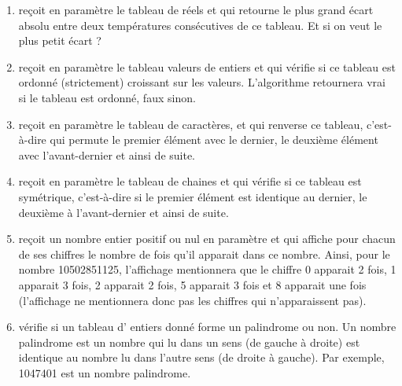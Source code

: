 \documentclass[11pt,a4paper]{article}
\begin{document}
					\begin{enumerate}
				
			\item  re\c coit en param\`etre le tableau  de 
              \verb@n@  r\'eels et qui retourne
              le plus grand \'ecart absolu entre deux temp\'eratures cons\'ecutives de ce tableau. Et si on veut
              le plus petit \'ecart ?
            
			\item 
              re\c coit en param\`etre le tableau valeurs de \verb@n@ entiers et qui v\'erifie si ce
              tableau est ordonn\'e (strictement) croissant sur les valeurs. L'algorithme retournera vrai si le
              tableau est ordonn\'e, faux sinon.
            
			\item 
              re\c coit en param\`etre le tableau \verb@tabCar@ 
              de \verb@n@ caract\`eres, et qui \guillemotleft  renverse \guillemotright 
              ce tableau, c'est-\`a-dire qui permute le premier \'el\'ement avec le dernier, le deuxi\`eme \'el\'ement
              avec l'avant-dernier et ainsi de suite.
              
			\item 
              re\c coit en param\`etre le tableau \verb@tabChaines@ 
              de \verb@n@ chaines et qui v\'erifie
              si ce tableau est sym\'etrique, c'est-\`a-dire si le premier \'el\'ement est identique au dernier, le
              deuxi\`eme \`a l'avant-dernier et ainsi de suite.
            
			\item 
              re\c coit un nombre entier positif ou nul en param\`etre et qui affiche pour
              chacun de ses chiffres le nombre de fois qu'il apparait dans ce nombre. Ainsi, pour le nombre
              10502851125, l'affichage mentionnera que le chiffre 0 apparait 2 fois, 1 apparait 3 fois, 2
              apparait 2 fois, 5 apparait 3 fois et 8 apparait une fois (l'affichage ne mentionnera donc pas
              les chiffres qui n'apparaissent pas).
            
			\item 
              v\'erifie si un tableau d' entiers donn\'e forme un palindrome ou non. Un nombre
              palindrome est un nombre qui lu dans un sens (de gauche \`a droite) est identique au nombre
              lu dans l'autre sens (de droite \`a gauche). Par exemple, 1047401 est un nombre palindrome.
            
					\end{enumerate}
				
\end{document}
